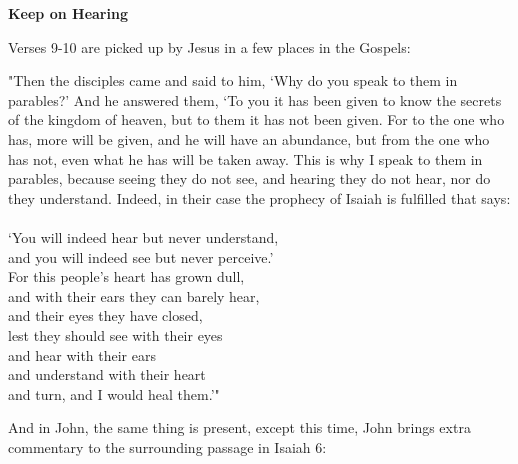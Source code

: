 \documentclass[11pt]{article}
\begin{document}
{\vspace{2em}}
{\large\bfseries Keep on Hearing}

{\vspace{1em}}

Verses 9-10 are picked up by Jesus in a few places in the Gospels:

{\vspace{1em}}

\begin{versesection}{2em}

 "Then the disciples came and said to him, `Why do you speak to them in parables?'  And he answered them, `To you it has been given to know the secrets of the kingdom of heaven, but to them it has not been given.  For to the one who has, more will be given, and he will have an abundance, but from the one who has not, even what he has will be taken away.  This is why I speak to them in parables, because seeing they do not see, and hearing they do not hear, nor do they understand.  Indeed, in their case the prophecy of Isaiah is fulfilled that says: \\\\`You will indeed hear but never understand,\\ \poetryline{} and you will indeed see but never perceive.'\\  For this people's heart has grown dull,\\ \poetryline{} and with their ears they can barely hear,\\ \poetryline{} and their eyes they have closed, \\ lest they should see with their eyes \\ \poetryline{} and hear with their ears\\ and understand with their heart\\ \poetryline{} and turn, and I would heal them.'"
\end{versesection}

{\vspace{1em}}
And in John, the same thing is present, except this time, John brings extra commentary to the surrounding passage in Isaiah 6:
\end{document}
